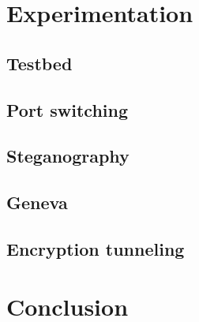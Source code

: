 \documentclass[12pt, fleqn, a4paper]{article}
\begin{document}
\section{Experimentation}
\subsection{Testbed}
\subsection{Port switching}
\subsection{Steganography}
\subsection{Geneva}
\subsection{Encryption tunneling}
\section*{\centering Conclusion}

% 
\end{document}
